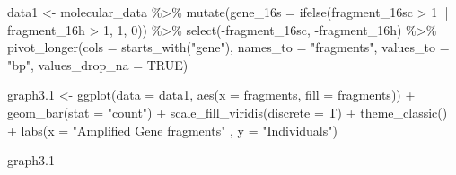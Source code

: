\documentclass[
]{book}
\newenvironment{Shaded}{\begin{snugshade}}{\end{snugshade}}
\newcommand{\AttributeTok}[1]{\textcolor[rgb]{0.77,0.63,0.00}{#1}}
\newcommand{\ConstantTok}[1]{\textcolor[rgb]{0.00,0.00,0.00}{#1}}
\newcommand{\DecValTok}[1]{\textcolor[rgb]{0.00,0.00,0.81}{#1}}
\newcommand{\FloatTok}[1]{\textcolor[rgb]{0.00,0.00,0.81}{#1}}
\newcommand{\FunctionTok}[1]{\textcolor[rgb]{0.00,0.00,0.00}{#1}}
\newcommand{\NormalTok}[1]{#1}
\newcommand{\OtherTok}[1]{\textcolor[rgb]{0.56,0.35,0.01}{#1}}
\newcommand{\SpecialCharTok}[1]{\textcolor[rgb]{0.00,0.00,0.00}{#1}}
\newcommand{\StringTok}[1]{\textcolor[rgb]{0.31,0.60,0.02}{#1}}
\begin{document}
\begin{Shaded}
\begin{Highlighting}[]
\NormalTok{data1 }\OtherTok{\textless{}{-}}\NormalTok{ molecular\_data }\SpecialCharTok{\%\textgreater{}\%}  
  \FunctionTok{mutate}\NormalTok{(}\AttributeTok{gene\_16s =} \FunctionTok{ifelse}\NormalTok{(fragment\_16sc }\SpecialCharTok{\textgreater{}} \DecValTok{1} \SpecialCharTok{||}\NormalTok{ fragment\_16h }\SpecialCharTok{\textgreater{}} \DecValTok{1}\NormalTok{, }\DecValTok{1}\NormalTok{, }\DecValTok{0}\NormalTok{)) }\SpecialCharTok{\%\textgreater{}\%} 
  \FunctionTok{select}\NormalTok{(}\SpecialCharTok{{-}}\NormalTok{fragment\_16sc, }\SpecialCharTok{{-}}\NormalTok{fragment\_16h) }\SpecialCharTok{\%\textgreater{}\%} 
  \FunctionTok{pivot\_longer}\NormalTok{(}\AttributeTok{cols =} \FunctionTok{starts\_with}\NormalTok{(}\StringTok{"gene"}\NormalTok{),}
               \AttributeTok{names\_to =} \StringTok{"fragments"}\NormalTok{,}
               \AttributeTok{values\_to =} \StringTok{"bp"}\NormalTok{,}
               \AttributeTok{values\_drop\_na =} \ConstantTok{TRUE}\NormalTok{)}

\NormalTok{graph3}\FloatTok{.1} \OtherTok{\textless{}{-}} \FunctionTok{ggplot}\NormalTok{(}\AttributeTok{data =}\NormalTok{ data1, }\FunctionTok{aes}\NormalTok{(}\AttributeTok{x =}\NormalTok{ fragments, }\AttributeTok{fill =}\NormalTok{ fragments)) }\SpecialCharTok{+}
  \FunctionTok{geom\_bar}\NormalTok{(}\AttributeTok{stat =} \StringTok{"count"}\NormalTok{) }\SpecialCharTok{+}
  \FunctionTok{scale\_fill\_viridis}\NormalTok{(}\AttributeTok{discrete =}\NormalTok{ T) }\SpecialCharTok{+}
  \FunctionTok{theme\_classic}\NormalTok{() }\SpecialCharTok{+}
  \FunctionTok{labs}\NormalTok{(}\AttributeTok{x =} \StringTok{"Amplified Gene fragments"}\NormalTok{ , }\AttributeTok{y =} \StringTok{"Individuals"}\NormalTok{)}

\NormalTok{graph3}\FloatTok{.1}
\end{Highlighting}
\end{Shaded}


  
\end{document}
